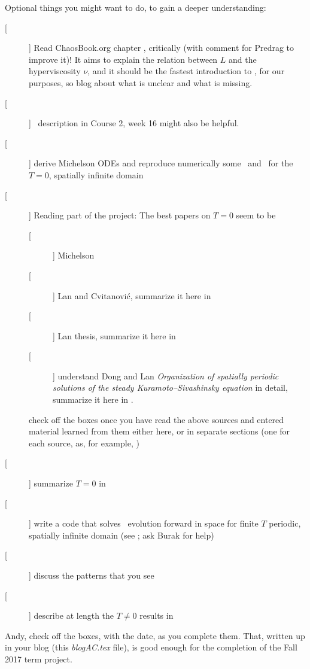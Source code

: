 \begin{description}
{Optional things you might want to do, to gain a deeper understanding:
\begin{description}
  \item[[ ]] Read ChaosBook.org chapter
,
critically (with comment for Predrag to improve it)!
It aims to explain the relation between $L$ and the hyperviscosity
$\nu$, and it should be the fastest introduction to \KSe, for our
purposes, so blog %
about what is unclear and what is missing.
  \item[[ ]] \KS\ description in 
   {Course 2, week 16}
  might also be helpful.
  \item[[ ]] derive Michelson ODEs and reproduce numerically
  some \eqva\ and \reqva\ for the $T=0$, spatially infinite domain
  \item[[ ]] Reading part of the project:
The best papers on $T=0$ seem to be
\begin{description}
  \item[[ ]] Michelson
  \item[[ ]] Lan and Cvitanovi{\'c}, summarize it here in
  \item[[ ]] Lan thesis, summarize it here in
  \item[[ ]] understand Dong and Lan {\em Organization of
  spatially periodic solutions of the steady {Kuramoto–Sivashinsky}
  equation} in detail, summarize it here in .
\end{description}
check off the boxes once you have read the above sources
and entered material learned from them either here, or in separate
sections (one for each source, as, for example, )
  \item[[ ]] summarize $T=0$ in 
  \item[[ ]] write a code that solves
 \KS\ evolution forward in space for finite $T$ periodic, spatially infinite domain
 (see ; ask Burak for help)
  \item[[ ]] discuss the patterns that you see
  \item[[ ]] describe at length the $T\neq0$ results in 
\end{description}
Andy, check off the boxes, with the date, as you complete them.
That, written up in your blog (this \emph{blogAC.tex} file), is good
enough for the completion of the Fall 2017 term project.
    }


\end{description}
